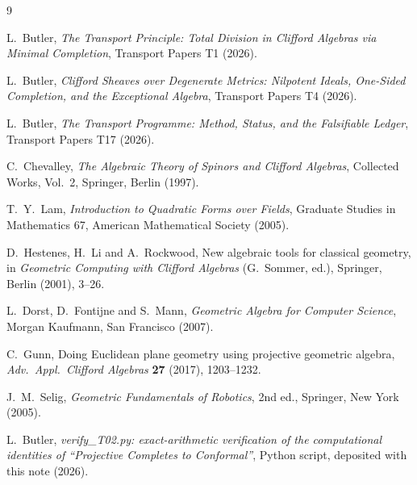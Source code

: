 \documentclass[11pt]{article}
\theoremstyle{definition}
\begin{document}
\begin{thebibliography}{9}

L.~Butler,
\emph{The Transport Principle: Total Division in Clifford Algebras via Minimal Completion},
Transport Papers T1 (2026).

L.~Butler,
\emph{Clifford Sheaves over Degenerate Metrics: Nilpotent Ideals, One-Sided Completion, and the Exceptional Algebra},
Transport Papers T4 (2026).

L.~Butler,
\emph{The Transport Programme: Method, Status, and the Falsifiable Ledger},
Transport Papers T17 (2026).

C.~Chevalley,
\emph{The Algebraic Theory of Spinors and Clifford Algebras},
Collected Works, Vol.~2, Springer, Berlin (1997).

T.~Y.~Lam,
\emph{Introduction to Quadratic Forms over Fields},
Graduate Studies in Mathematics 67, American Mathematical Society (2005).

D.~Hestenes, H.~Li and A.~Rockwood,
New algebraic tools for classical geometry,
in \emph{Geometric Computing with Clifford Algebras} (G.~Sommer, ed.), Springer, Berlin (2001), 3--26.

L.~Dorst, D.~Fontijne and S.~Mann,
\emph{Geometric Algebra for Computer Science},
Morgan Kaufmann, San Francisco (2007).

C.~Gunn,
Doing Euclidean plane geometry using projective geometric algebra,
\emph{Adv.\ Appl.\ Clifford Algebras} \textbf{27} (2017), 1203--1232.

J.~M.~Selig,
\emph{Geometric Fundamentals of Robotics}, 2nd ed.,
Springer, New York (2005).

L.~Butler,
\emph{verify\_T02.py: exact-arithmetic verification of the computational identities of ``Projective Completes to Conformal''},
Python script, deposited with this note (2026).

\end{thebibliography}
\end{document}
